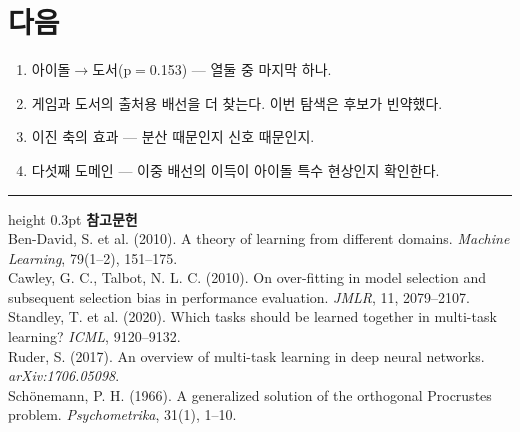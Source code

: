 \documentclass[10pt]{article}
\begin{document}
\section{다음}

\begin{enumerate}[leftmargin=1.3em,itemsep=0.15em]
\item 아이돌$\to$도서(p$=$0.153) --- 열둘 중 마지막 하나.
\item 게임과 도서의 출처용 배선을 더 찾는다. 이번 탐색은 후보가 빈약했다.
\item 이진 축의 효과 --- 분산 때문인지 신호 때문인지.
\item 다섯째 도메인 --- 이중 배선의 이득이 아이돌 특수 현상인지 확인한다.
\end{enumerate}

\vspace{0.6em}
\hrule height 0.3pt
\vspace{0.5em}
{\footnotesize
\textbf{참고문헌}\\[0.3em]
Ben-David, S. et al. (2010). A theory of learning from different domains.
\emph{Machine Learning}, 79(1--2), 151--175.\\[0.15em]
Cawley, G. C., Talbot, N. L. C. (2010). On over-fitting in model selection and
subsequent selection bias in performance evaluation. \emph{JMLR}, 11, 2079--2107.\\[0.15em]
Standley, T. et al. (2020). Which tasks should be learned together in multi-task
learning? \emph{ICML}, 9120--9132.\\[0.15em]
Ruder, S. (2017). An overview of multi-task learning in deep neural networks.
\emph{arXiv:1706.05098}.\\[0.15em]
Schönemann, P. H. (1966). A generalized solution of the orthogonal Procrustes
problem. \emph{Psychometrika}, 31(1), 1--10.
}
\end{document}
